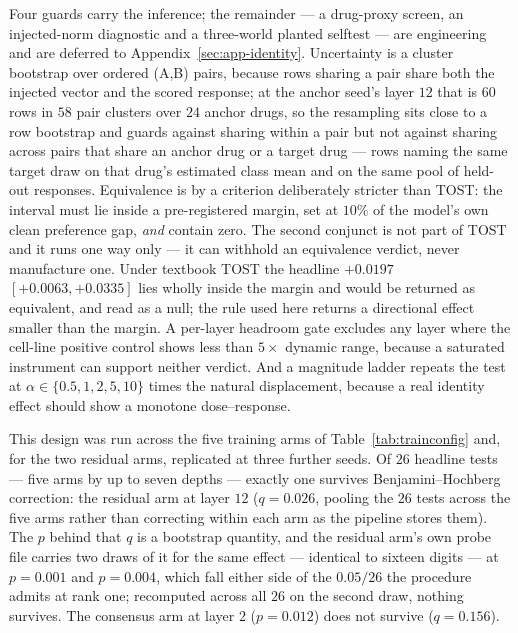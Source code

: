 Four guards carry the inference; the remainder --- a drug-proxy screen, an injected-norm diagnostic
and a three-world planted selftest --- are engineering and are deferred to
Appendix~\ref{sec:app-identity}. Uncertainty is a cluster bootstrap over ordered (A,B) pairs,
because rows sharing a pair share both the injected vector and the scored response; at the anchor
seed's layer $12$ that is $60$ rows in $58$ pair clusters over $24$ anchor drugs, so the resampling
sits close to a row bootstrap and guards against sharing within a pair but not against sharing
across pairs that share an anchor drug or a target drug --- rows naming the same target draw on
that drug's estimated class mean and on the same pool of held-out responses. Equivalence is by a criterion deliberately stricter
than TOST: the interval must lie inside a pre-registered margin, set at $10\%$ of the model's own
clean preference gap, \emph{and} contain zero. The second conjunct is not part of TOST and it runs
one way only --- it can withhold an equivalence verdict, never manufacture one. Under textbook TOST
the headline $+0.0197$ \nolinebreak[3]$[+0.0063, +0.0335]$ lies wholly inside the margin and would
be returned as equivalent, and read as a null; the rule used here returns a directional effect
smaller than the margin. A per-layer headroom gate excludes any layer
where the cell-line positive control shows less than $5\times$ dynamic range, because a saturated
instrument can support neither verdict. And a magnitude ladder repeats the test at $\alpha \in
\{0.5, 1, 2, 5, 10\}$ times the natural displacement, because a real identity effect should show a
monotone dose--response.

This design was run across the five training arms of Table~\ref{tab:trainconfig} and, for the two
residual arms, replicated at three further seeds. Of $26$ headline tests --- five arms by up to
seven depths --- exactly one survives Benjamini--Hochberg correction: the residual arm at layer $12$
($q = 0.026$, pooling the $26$ tests across the five arms rather than correcting within each arm as
the pipeline stores them). The $p$ behind that $q$ is a bootstrap quantity, and the residual arm's
own probe file carries
two draws of it for the same effect --- identical to sixteen digits --- at $p = 0.001$ and
$p = 0.004$, which fall either side of the $0.05/26$ the procedure admits at rank one; recomputed
across all $26$ on the second draw, nothing survives. The consensus arm at layer $2$ ($p = 0.012$)
does not survive ($q = 0.156$).

